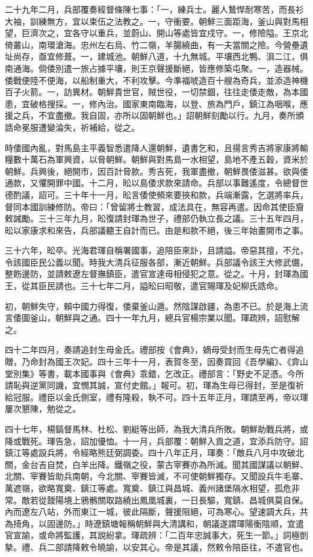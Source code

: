 \begin{pinyinscope}
二十九年二月，兵部覆奏經督條陳七事：「一，練兵士。麗人鷙悍耐寒苦，而長衫大袖，訓練無方，宜以束伍之法教之。一，守衝要。朝鮮三面距海，釜山與對馬相望，巨濟次之，宜各守以重兵，並蔚山、開山等處皆宜戍守。一，修險隘。王京北倚叢山，南環滄海。忠州左右烏、竹二嶺，羊腸繞曲，有一夫當關之險。今營壘遺址尚存，亟宜修葺。一，建城池。朝鮮八道，十九無城。平壤西北鴨、浿二江，俱南通海。倘倭別遣一旅占據平壤，則王京聲援斷絕，皆應修築屯聚。一，造器械。倭戰便陸不便海，以船制重大，不利攻擊。今準福唬造百十艘為奇兵，並添造神機百子火箭。一，訪異材。朝鮮貴世官，賊世役，一切禁錮，往往走倭走敵，為本國患，宜破格搜採。一，修內治。國家東南臨海，以登、旅為門戶，鎮江為咽喉，應援之兵，不宜盡撤。我自固，亦所以固朝鮮也。」詔朝鮮刻勵以行。九月，奏所頒誥命冕服遭變淪失，祈補給，從之。

時倭國內亂，對馬島主平義智悉遣降人還朝鮮，遺書乞和，且揚言秀吉將家康將輸糧數十萬石為軍興資，以脅朝鮮。朝鮮與對馬島一水相望，島地不產五穀，資米於朝鮮。兵興後，絕開市，因百計脅款。秀吉死，我軍盡撤，朝鮮畏倭滋甚。欲與倭通款，又懼開罪中國。十二月，昖以島倭求款來請命。兵部以事難遙度，令總督世德酌議，詔可。三十年十一月，昖言倭使頻來要挾和款，兵端漸露，乞選將率兵，督同本國訓練修防。帝曰：「曾留將士教習，成法具在，無容再遣。因命其使臣齎敕誡勵。三十三年九月，昖復請封琿為世子，禮部仍執立長之議。三十五年四月，昖以家康求和來告，兵部議聽王自計而已。由是和款不絕，後三年始畫開市之事。

三十六年，昖卒。光海君琿自稱署國事，追陪臣來訃，且請謚。帝惡其擅，不允，令該國臣民公義以聞。時我大清兵征服各部，漸近朝鮮。兵部議令該王大修武備，整飭邊防，並請敕遼左督撫鎮臣，遣官宣達毋相侵犯之意。從之。十月，封琿為國王，從其臣民請也。三十七年二月，謚昖曰昭敬，遣官賜琿及妃柳氏誥命。

初，朝鮮失守，賴中國力得復，倭棄釜山遁。然陰謀啟疆，為患不已。於是海上流言倭圖釜山，朝鮮與之通。四十一年九月，總兵官楊宗業以聞。琿疏辨，詔慰解之。

四十二年四月，奏請追封生母金氏。禮部按《會典》，嫡母受封而生母先亡者得追贈，乃命封為國王次妃。四十三年十一月，表賀冬至，因奏買回《吾學編》、《弇山堂別集》等書，載本國事與《會典》乖錯，乞改正。禮部言：「野史不足憑。今所請恥與逆黨同譏，宜憫其誠，宣付史館。」報可。初，琿為生母已得封，至是復祈給冠服。禮臣以金氏側室，禮有隆殺，執不可。四十五年正月，琿請至再，帝以琿屢次懇陳，勉從之。

四十七年，楊鎬督馬林、杜松、劉綎等出師，為我大清兵所敗。朝鮮助戰兵將，或降或戰死。琿告急，詔加優恤。十一月，兵部覆：朝鮮入貢之道，宜添兵防守。詔鎮江等處設兵將，令經略熊廷弼調委。四十八年正月，琿奏：「敵兵八月中攻破北關，金台吉自焚，白羊出降。鐵嶺之役，蒙古宰賽亦為所滅。聞其國謀議以朝鮮、北關、宰賽皆助兵南朝，今北關、宰賽皆滅，不可使朝鮮獨存。又聞設兵牛毛寨、萬遮嶺，欲略寬奠、鎮江等處。寬奠、鎮江與昌城、義州諸堡隔水相望，孤危非常。敵若從靉陽境上鴉鶻關取路繞出鳳凰城裏，一日長驅，寬鎮、昌城俱莫自保。內而遼左八站，外而東江一城，彼此隔斷，聲援阻絕，可為寒心。望速調大兵，共為掎角，以固邊防。」時遼鎮塘報稱朝鮮與大清講和，朝議遂謂琿陽衡陰順，宜遣官宣諭，或命將監護，其說紛拿。琿疏辨：「二百年忠誠事大，死生一節。」詞極剴摯。禮、兵二部請降敕令曉諭，以安其心。帝是其議，然敕令陪臣往，不遣官也。


\end{pinyinscope}
